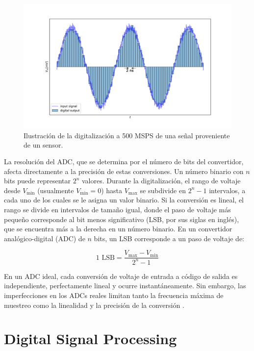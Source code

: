 \documentclass[]{book}
\begin{document}
\begin{figure}[h]
    \centering
    \includegraphics[width=1.0\textwidth]{adc_out.png}
    \caption{Ilustración de la digitalización a 500 MSPS de una señal proveniente de un sensor.}
    \label{fig:adc_out}

\end{figure}

\noindent La resolución del ADC, que se determina por el número de bits del convertidor, afecta directamente a la precisión de estas conversiones. Un número binario con $n$ bits puede representar $2^{n}$ valores. Durante la digitalización, el rango de voltaje desde $V_{\text{min}}$ (usualmente $V_{\text{min}} = 0$) hasta $V_{\text{max}}$ se subdivide en $2^{n} - 1$ intervalos, a cada uno de los cuales se le asigna un valor binario. Si la conversión es lineal, el rango se divide en intervalos de tamaño igual, donde el paso de voltaje más pequeño corresponde al bit menos significativo (LSB, por sus siglas en inglés), que se encuentra más a la derecha en un número binario. En un convertidor analógico-digital (ADC) de $n$ bits, un LSB corresponde a un paso de voltaje de:

\begin{equation}
    1 \text{ LSB} = \frac{V_{\text{max}} - V_{\text{min}}}{2^n - 1}
\end{equation}

\noindent En un ADC ideal, cada conversión de voltaje de entrada a código de salida es independiente, perfectamente lineal y ocurre instantáneamente. Sin embargo, las imperfecciones en los ADCs reales limitan tanto la frecuencia máxima de muestreo como la linealidad y la precisión de la conversión \cite{kolanoski2020particle}.


\section{Digital Signal Processing}
\label{sec:digital_processing}
\end{document}
